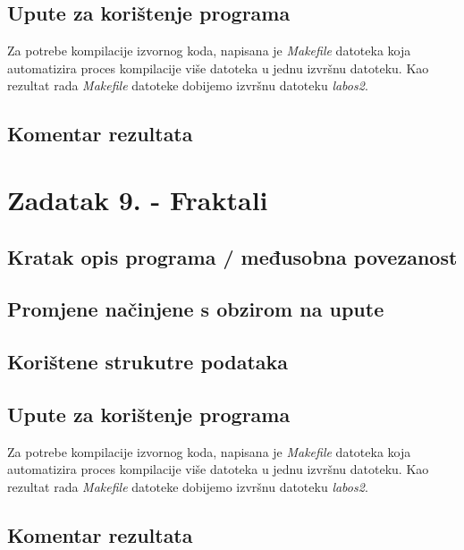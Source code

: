 \documentclass{report}
\begin{document}
\subsection{Upute za korištenje programa}
Za potrebe kompilacije izvornog koda, napisana je \textit{Makefile} datoteka koja automatizira proces kompilacije više datoteka u jednu izvršnu datoteku. Kao rezultat rada \textit{Makefile} datoteke dobijemo izvršnu datoteku \textit{labos2}.

\subsection{Komentar rezultata}

\section{Zadatak 9. - Fraktali}
\subsection{Kratak opis programa / međusobna povezanost}
\subsection{Promjene načinjene s obzirom na upute}
\subsection{Korištene strukutre podataka}
\subsection{Upute za korištenje programa}
Za potrebe kompilacije izvornog koda, napisana je \textit{Makefile} datoteka koja automatizira proces kompilacije više datoteka u jednu izvršnu datoteku. Kao rezultat rada \textit{Makefile} datoteke dobijemo izvršnu datoteku \textit{labos2}.

\subsection{Komentar rezultata}
\end{document}
